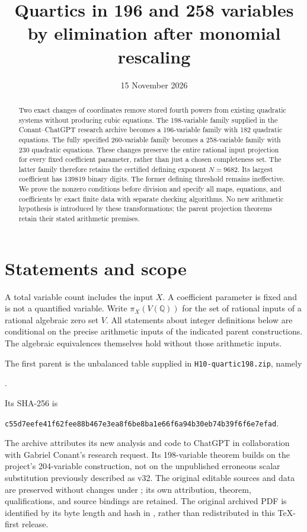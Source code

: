 \documentclass[11pt,a4paper]{article}
\title{Quartics in 196 and 258 variables by elimination after monomial rescaling}
\author{}\date{15 November 2026}
\newcommand{\Q}{\mathbb Q}\newcommand{\Z}{\mathbb Z}\newcommand{\Nm}{\operatorname{N}}
\begin{document}
\maketitle
\begin{abstract}
Two exact changes of coordinates remove stored fourth powers from existing
quadratic systems without producing cubic equations. The 198-variable family
supplied in the Conant--ChatGPT research archive becomes a 196-variable
family with 182 quadratic equations. The fully specified 260-variable family
becomes a 258-variable family with 230 quadratic equations. These changes
preserve the entire rational input projection for every fixed coefficient
parameter, rather than just a chosen completeness set. The latter family
therefore retains the certified defining exponent $N=9682$. Its largest
coefficient has 139819 binary digits. The former defining threshold remains
ineffective. We prove the nonzero conditions before division and specify all
maps, equations, and coefficients by exact finite data with separate checking
algorithms. No new arithmetic hypothesis is introduced by these transformations;
the parent projection theorems retain their stated arithmetic premises.
\end{abstract}

\section{Statements and scope}
A total variable count includes the input $X$. A coefficient parameter is
fixed and is not a quantified variable. Write $\pi_X(V(\Q))$ for the set of
rational inputs of a rational algebraic zero set $V$. All statements about
integer definitions below are conditional on the precise arithmetic inputs
of the indicated parent constructions. The algebraic equivalences themselves
hold without those arithmetic inputs.

The first parent is the unbalanced table supplied in
\texttt{H10-quartic198.zip}, namely
\begin{center}\small{}.\end{center}
Its SHA-256 is
\begin{center}\small\texttt{c55d7eefe41f62fee88b467e3ea8f6be8ba1e66f6a94b30eb74b39f6f6e7efad}.\end{center}
The archive attributes its new analysis and code to ChatGPT in collaboration
with Gabriel Conant's research request. Its 198-variable theorem builds on
the project's 204-variable construction, not on the unpublished erroneous
scalar substitution previously described as v32. The original editable sources and data are
preserved without changes under ; its own
attribution, theorem, qualifications, and source bindings are retained.
The original archived PDF is identified by its byte length and hash in
, rather than redistributed in this TeX-first release.
\end{document}
